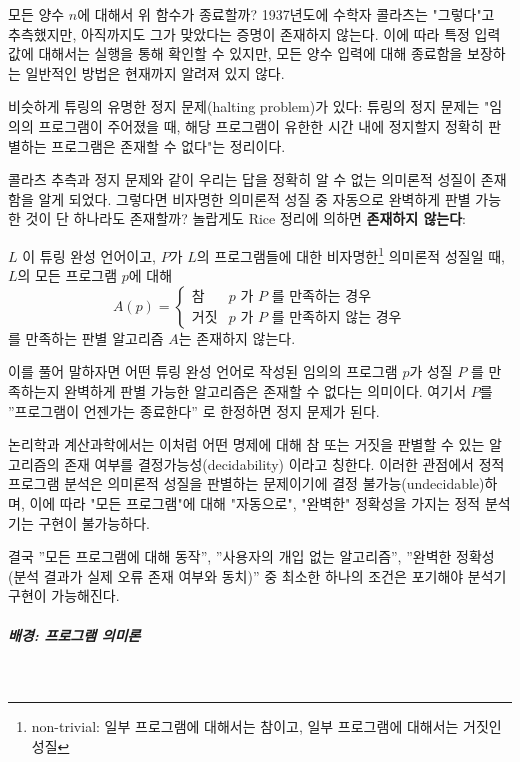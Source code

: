 \documentclass[a4paper,12pt]{article}
\begin{document}
모든 양수 $n$에 대해서 위 함수가 종료할까? 1937년도에 수학자 콜라츠는 "그렇다"고 추측했지만, 아직까지도 그가 맞았다는 증명이 존재하지 않는다.
이에 따라 특정 입력값에 대해서는 실행을 통해 확인할 수 있지만, 모든 양수 입력에 대해 종료함을 보장하는 일반적인 방법은 현재까지 알려져 있지 않다.

비슷하게 튜링의 유명한 정지 문제(halting problem)\cite{turing1936}가 있다: 튜링의 정지 문제는 "임의의 프로그램이 주어졌을 때, 해당 프로그램이 유한한 시간 내에 정지할지 정확히 판별하는
프로그램은 존재할 수 없다"는 정리이다.

콜라츠 추측과 정지 문제와 같이 우리는 답을 정확히 알 수 없는 의미론적 성질이 존재함을 알게 되었다. 그렇다면 비자명한 의미론적 성질 중 자동으로 완벽하게 판별 가능한 것이 단 하나라도 존재할까? 놀랍게도
Rice 정리에 의하면 \textbf{존재하지 않는다}:

\begin{utheorem}
	$L$ 이 튜링 완성 언어이고, $P$가 $L$의 프로그램들에 대한 비자명한\footnote{non-trivial: 일부 프로그램에 대해서는 참이고, 일부 프로그램에 대해서는 거짓인 성질} 의미론적 성질일 때, $L$의 모든 프로그램 $p$에 대해
$$
    A(p)=
\begin{cases}
\text{참} & p \text{ 가 } P \text{ 를 만족하는 경우} \\
\text{거짓} &p \text{ 가 }  P \text{ 를 만족하지 않는 경우}
\end{cases}
$$
를 만족하는 판별 알고리즘 $A$는 존재하지 않는다.
\end{utheorem}

이를 풀어 말하자면 어떤 튜링 완성 언어로 작성된 임의의 프로그램 $p$가 성질 $P$ 를 만족하는지 완벽하게 판별 가능한 알고리즘은 존재할 수 없다는 의미이다. 
여기서 $P$를 ”프로그램이 언젠가는 종료한다” 로 한정하면 정지 문제가 된다.

논리학과 계산과학에서는 이처럼 어떤 명제에 대해 참 또는 거짓을 판별할 수 있는 알고리즘의 존재 여부를 결정가능성(decidability)\cite{moller2012} 이라고 칭한다.
이러한 관점에서 정적 프로그램 분석은 의미론적 성질을 판별하는 문제이기에 결정 불가능(undecidable)하며, 이에 따라 "모든 프로그램"에 대해 "자동으로", "완벽한" 정확성을 가지는 정적 분석기는 구현이 불가능하다.

결국 ”모든 프로그램에 대해 동작”, ”사용자의 개입 없는 알고리즘”, ”완벽한 정확성(분석 결과가 실제 오류 존재 여부와 동치)” 중 최소한 하나의 조건은 포기해야 분석기 구현이 가능해진다.

\subparagraph{배경: 프로그램 의미론} ~\\
\end{document}

